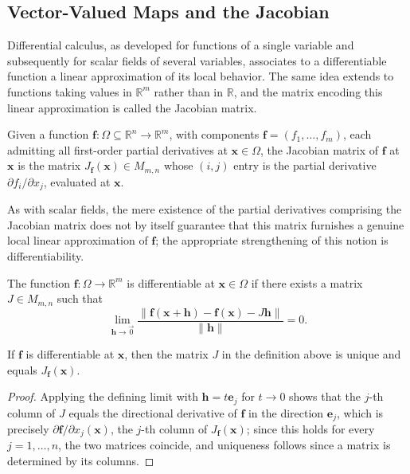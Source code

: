 \subsection{Vector-Valued Maps and the Jacobian}

Differential calculus, as developed for functions of a single variable and subsequently for scalar fields of several variables, associates to a differentiable function a linear approximation of its local behavior. The same idea extends to functions taking values in $\mathbb{R}^m$ rather than in $\mathbb{R}$, and the matrix encoding this linear approximation is called the Jacobian matrix.

\begin{definition}
Given a function $\mathbf{f} : \Omega \subseteq \mathbb{R}^n \to \mathbb{R}^m$, with components $\mathbf{f} = (f_1, \dots, f_m)$, each admitting all first-order partial derivatives at $\mathbf{x} \in \Omega$, the Jacobian matrix of $\mathbf{f}$ at $\mathbf{x}$ is the matrix $J_{\mathbf{f}}(\mathbf{x}) \in M_{m,n}$ whose $(i,j)$ entry is the partial derivative $\partial f_i / \partial x_j$, evaluated at $\mathbf{x}$.
\end{definition}

As with scalar fields, the mere existence of the partial derivatives comprising the Jacobian matrix does not by itself guarantee that this matrix furnishes a genuine local linear approximation of $\mathbf{f}$; the appropriate strengthening of this notion is differentiability.

\begin{definition}
The function $\mathbf{f} : \Omega \to \mathbb{R}^m$ is differentiable at $\mathbf{x} \in \Omega$ if there exists a matrix $J \in M_{m,n}$ such that
\[
\lim_{\mathbf{h} \to \vec{0}} \frac{\|\mathbf{f}(\mathbf{x}+\mathbf{h}) - \mathbf{f}(\mathbf{x}) - J\mathbf{h}\|}{\|\mathbf{h}\|} = 0.
\]

\end{definition}

\begin{theorem}
If $\mathbf{f}$ is differentiable at $\mathbf{x}$, then the matrix $J$ in the definition above is unique and equals $J_{\mathbf{f}}(\mathbf{x})$.

\end{theorem}

\begin{proof}
Applying the defining limit with $\mathbf{h} = t\mathbf{e}_j$ for $t \to 0$ shows that the $j$-th column of $J$ equals the directional derivative of $\mathbf{f}$ in the direction $\mathbf{e}_j$, which is precisely $\partial \mathbf{f}/\partial x_j (\mathbf{x})$, the $j$-th column of $J_{\mathbf{f}}(\mathbf{x})$; since this holds for every $j = 1, \dots, n$, the two matrices coincide, and uniqueness follows since a matrix is determined by its columns.
\end{proof}

